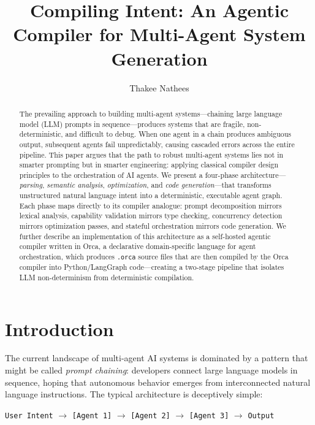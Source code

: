 \documentclass[sigconf,nonacm]{acmart}
\title{Compiling Intent: An Agentic Compiler for Multi-Agent System Generation}
\author{Thakee Nathees}
\affiliation{%
  \institution{Curtin University}
  \department{Department of Computing}
  \city{Perth}
  \country{Australia}
}
\begin{document}
\begin{abstract}
The prevailing approach to building multi-agent systems---chaining large
language model (LLM) prompts in sequence---produces systems that are
fragile, non-deterministic, and difficult to debug. When one agent in a
chain produces ambiguous output, subsequent agents fail unpredictably,
causing cascaded errors across the entire pipeline. This paper argues
that the path to robust multi-agent systems lies not in smarter
prompting but in smarter engineering: applying classical compiler design
principles to the orchestration of AI agents. We present a four-phase
architecture---\emph{parsing}, \emph{semantic analysis},
\emph{optimization}, and \emph{code generation}---that transforms
unstructured natural language intent into a deterministic, executable
agent graph. Each phase maps directly to its compiler analogue: prompt
decomposition mirrors lexical analysis, capability validation mirrors
type checking, concurrency detection mirrors optimization passes, and
stateful orchestration mirrors code generation. We further describe an
implementation of this architecture as a self-hosted agentic compiler
written in Orca, a declarative domain-specific language for agent
orchestration, which produces \texttt{.orca} source files that are then
compiled by the Orca compiler into Python/LangGraph code---creating a
two-stage pipeline that isolates LLM non-determinism from deterministic
compilation.
\end{abstract}

\maketitle

\section{Introduction}
\label{sec:intro}

The current landscape of multi-agent AI systems is dominated by a
pattern that might be called \emph{prompt chaining}: developers connect
large language models in sequence, hoping that autonomous behavior
emerges from interconnected natural language instructions. The typical
architecture is deceptively simple:

\begin{center}
\texttt{User Intent} $\rightarrow$ \texttt{[Agent 1]} $\rightarrow$
\texttt{[Agent 2]} $\rightarrow$ \texttt{[Agent 3]} $\rightarrow$
\texttt{Output}
\end{center}
\end{document}
